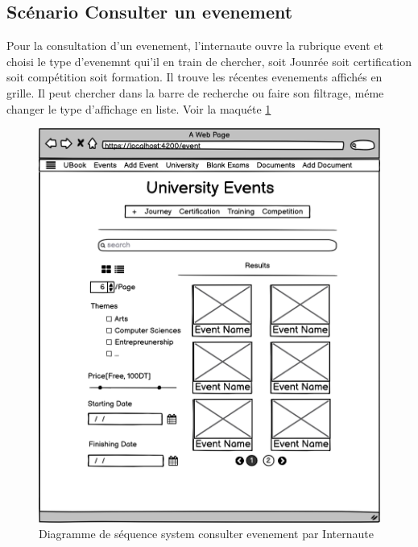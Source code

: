 \documentclass[12pt]{report}
\begin{document}
\subsection{Scénario Consulter un evenement}
Pour la consultation d'un evenement, l'internaute ouvre la rubrique event et choisi le type d'evenemnt qui'il en train de chercher, soit Jounrée soit certification soit compétition soit formation. Il trouve les récentes evenements affichés en grille. Il peut chercher dans la barre de recherche ou faire son filtrage, méme changer le type d'affichage en liste. Voir la maquéte \ref{fig: maqwakahow}
\begin{figure}[hbtp]
    \centering
    \includegraphics[width=.88\textwidth]{Consulter Event}
    \caption{Diagramme de séquence system consulter evenement par Internaute}
    \label{fig: maqwakahow}
\end{figure}
\newpage
\end{document}
